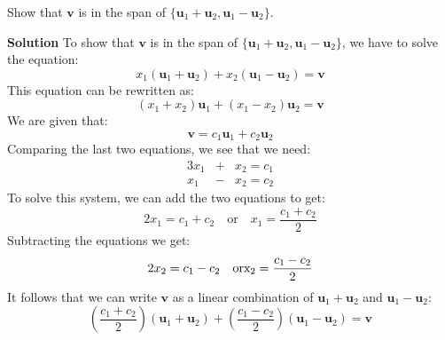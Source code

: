 \documentclass[12pt]{article}
\begin{document}
Show that $\mathbf{v}$ is in the span of $\{\mathbf{u}_1+\mathbf{u}_2, \mathbf{u}_1-\mathbf{u}_2\}$.

\textbf{Solution} To show that $\mathbf{v}$ is in the span of $\{\mathbf{u}_1+\mathbf{u}_2, \mathbf{u}_1-\mathbf{u}_2\}$, we have to solve the equation:
\[
x_1(\mathbf{u}_1+\mathbf{u}_2)+x_2(\mathbf{u}_1-\mathbf{u}_2)=\mathbf{v}
\]
This equation can be rewritten as:
\[
(x_1+x_2)\mathbf{u}_1+(x_1-x_2)\mathbf{u}_2=\mathbf{v}
\]
We are given that:
\[
\mathbf{v}=c_1\mathbf{u}_1+c_2\mathbf{u}_2
\]
Comparing the last two equations, we see that we need:
\begin{alignat*}{3}
x_1 & {}+{} & x_2 {}={} c_1\\
x_1 & {}-{} & x_2 {}={} c_2
\end{alignat*}
To solve this system, we can add the two equations to get:
\[
2x_1=c_1+c_2\quad\text{or}\quad x_1=\frac{c_1+c_2}{2}
\]
Subtracting the equations we get:
\[
2x_2=c_1-c_2\quad\text{or}\text x_2=\frac{c_1-c_2}{2}
\]
It follows that we can write $\mathbf{v}$ as a linear combination of $\mathbf{u}_1+\mathbf{u}_2$ and $\mathbf{u}_1-\mathbf{u}_2$:
\[
\left(\frac{c_1+c_2}{2}\right)(\mathbf{u}_1+\mathbf{u}_2)+\left(\frac{c_1-c_2}{2}\right)(\mathbf{u}_1-\mathbf{u}_2)=\mathbf{v}
\]
\end{document}
